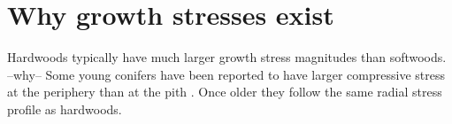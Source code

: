 \section{Why growth stresses exist}
Hardwoods typically have much larger growth stress magnitudes than softwoods.
--why-- \cite{barnett1981xylem} Some young conifers have been
reported to have larger compressive stress at the periphery than at the pith \cite{jacobs1945l}. Once older they follow the same radial stress profile
as hardwoods.